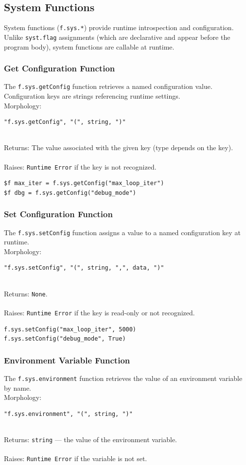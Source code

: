 \subsection{System Functions}

System functions (\texttt{f.sys.*}) provide runtime introspection and configuration. Unlike \texttt{syst.flag} assignments (which are declarative and appear before the program body), system functions are callable at runtime.

\subsubsection{Get Configuration Function}
The \texttt{f.sys.getConfig} function retrieves a named configuration value. Configuration keys are strings referencing runtime settings.
\\ Morphology:
\begin{verbatim}
"f.sys.getConfig", "(", string, ")"
\end{verbatim}
\\ Returns: The value associated with the given key (type depends on the key). \\
\\ Raises: \texttt{Runtime Error} if the key is not recognized.

\begin{verbatim}
$f max_iter = f.sys.getConfig("max_loop_iter")
$f dbg = f.sys.getConfig("debug_mode")
\end{verbatim}

\subsubsection{Set Configuration Function}
The \texttt{f.sys.setConfig} function assigns a value to a named configuration key at runtime.
\\ Morphology:
\begin{verbatim}
"f.sys.setConfig", "(", string, ",", data, ")"
\end{verbatim}
\\ Returns: \texttt{None}. \\
\\ Raises: \texttt{Runtime Error} if the key is read-only or not recognized.

\begin{verbatim}
f.sys.setConfig("max_loop_iter", 5000)
f.sys.setConfig("debug_mode", True)
\end{verbatim}

\subsubsection{Environment Variable Function}
The \texttt{f.sys.environment} function retrieves the value of an environment variable by name.
\\ Morphology:
\begin{verbatim}
"f.sys.environment", "(", string, ")"
\end{verbatim}
\\ Returns: \texttt{string} --- the value of the environment variable. \\
\\ Raises: \texttt{Runtime Error} if the variable is not set.

